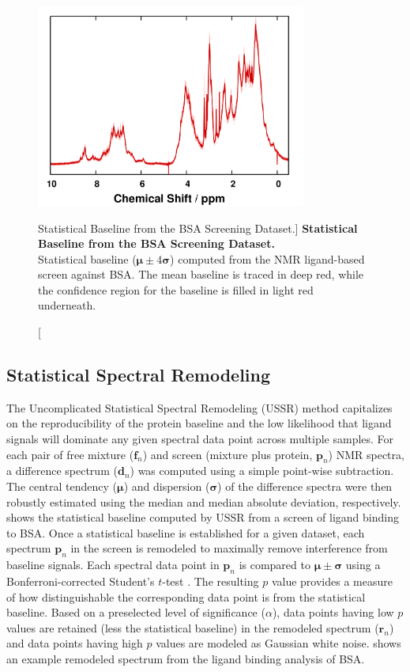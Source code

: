 \begin{figure}
\includegraphics[width=3.5in]{figs/ussr/01-baseline.png}
\caption
      [Statistical Baseline from the BSA Screening Dataset.]{
  {\bf Statistical Baseline from the BSA Screening Dataset.}
  \\
  Statistical baseline ($\boldsymbol{\mu} \pm 4 \boldsymbol{\sigma}$) computed
  from the \hnmr{} NMR ligand-based screen against BSA. The mean baseline is
  traced in deep red, while the confidence region for the baseline is filled
  in light red underneath.
}
\label{figure.7.1}
\end{figure}

\subsection{Statistical Spectral Remodeling}

\begin{doublespace}
The Uncomplicated Statistical Spectral Remodeling (USSR) method capitalizes on
the reproducibility of the protein baseline and the low likelihood that ligand
signals will dominate any given spectral data point across multiple samples.
For each pair of free mixture ($\mathbf{f}_n$) and screen (mixture plus
protein, $\mathbf{p}_n$) \hnmr{} NMR spectra, a difference spectrum
($\mathbf{d}_n$) was computed using a simple point-wise subtraction. The
central tendency ($\boldsymbol{\mu}$) and dispersion ($\boldsymbol{\sigma}$)
of the difference spectra were then robustly estimated using the median and
median absolute deviation, respectively.  shows the
statistical baseline computed by USSR from a screen of ligand binding to BSA.
Once a statistical baseline is established for a given dataset, each spectrum
$\mathbf{p}_n$ in the screen is remodeled to maximally remove interference
from baseline signals. Each spectral data point in $\mathbf{p}_n$ is compared
to $\boldsymbol{\mu} \pm \boldsymbol{\sigma}$ using a Bonferroni-corrected
Student's $t$-test \cite{dunn:jasa1961}. The resulting $p$ value provides a
measure of how distinguishable the corresponding data point is from the
statistical baseline. Based on a preselected level of significance ($\alpha$),
data points having low $p$ values are retained (less the statistical baseline)
in the remodeled spectrum ($\mathbf{r}_n$) and data points having high $p$
values are modeled as Gaussian white noise.  shows
an example remodeled spectrum from the ligand binding analysis of BSA.
\end{doublespace}

